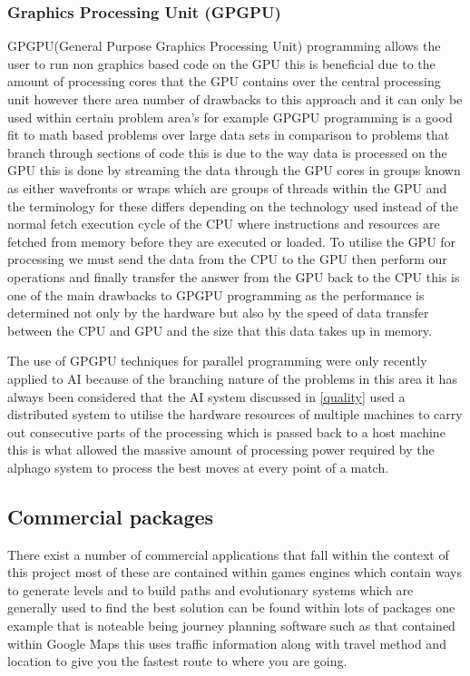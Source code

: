 \subsubsection{Graphics Processing Unit (GPGPU)}
GPGPU(General Purpose Graphics Processing Unit) programming allows the user to run non graphics based code on the GPU this is beneficial due to the amount of processing cores that the GPU contains over the central processing unit  however there area number of drawbacks to this approach and it can only be used within certain problem area's for example GPGPU programming is a good fit to math based problems over large data sets in comparison to problems that branch through sections of code this is due to the way data is processed on the GPU this is done by streaming the data through the GPU cores in groups known as either wavefronts or wraps which are groups of threads within the GPU and the terminology for these differs depending on the technology used instead of the normal fetch execution cycle of the CPU where instructions and resources are fetched from memory before they are executed or loaded. To utilise the GPU for processing we must send the data from the CPU to the GPU then perform our operations and finally transfer the answer from the GPU back to the CPU this is one of the main drawbacks to GPGPU programming as the performance is determined not only by the hardware but also by the speed of data transfer between the CPU and GPU and the size that this data takes up in memory.    

The use of GPGPU techniques for parallel programming were only recently applied to AI because of the branching nature of the problems in this area it has always been considered that  the AI system discussed in \ref{quality} used a distributed system to utilise the hardware resources of multiple machines to carry out consecutive parts of the processing which is passed back to a host machine this is what allowed the massive amount of processing power required by the alphago system to process the best moves at every point of a match. 

\subsection{Commercial packages}
There exist a number of commercial applications that fall within the context of this project most of these are contained within  games engines which contain ways to generate levels and to build paths and evolutionary systems which are generally used to find the best solution can be found within lots of packages one example that is noteable being journey planning software such as that contained within Google Maps this uses traffic information along with travel method and location to give you the fastest route to where you are going. 

\pagebreak

